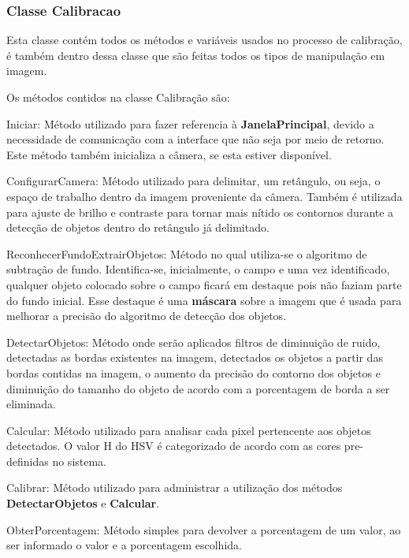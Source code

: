 \subsubsection{Classe Calibracao}
 Esta classe contém todos os métodos e variáveis usados no processo de calibração, é também dentro dessa classe que são feitas todos os tipos de manipulação em imagem.
 
Os métodos contidos na classe Calibração são:
	\begin{description}

\item Iniciar: Método utilizado para fazer referencia à \textbf{JanelaPrincipal}, devido a necessidade de comunicação com a interface que não seja por meio de retorno. Este método também inicializa a câmera, se esta estiver disponível.

\item ConfigurarCamera: Método utilizado para delimitar, um retângulo, ou seja, o espaço de trabalho dentro da imagem proveniente da câmera. Também é utilizada para ajuste de brilho e contraste para tornar mais nítido os contornos durante a detecção de objetos dentro do retângulo já delimitado.	
	
  \item ReconhecerFundoExtrairObjetos: Método no qual utiliza-se o algoritmo de subtração de fundo. Identifica-se, inicialmente, o campo e uma vez identificado, qualquer objeto colocado sobre o campo ficará em destaque pois não faziam parte do fundo inicial. Esse destaque é uma \textbf{máscara} sobre a imagem que é usada para melhorar a precisão do algoritmo de detecção dos objetos.
  
 	\item DetectarObjetos: Método onde serão aplicados filtros de diminuição de ruido, detectadas as bordas existentes na imagem, detectados os objetos a partir das bordas contidas na imagem, o aumento da precisão do contorno dos objetos e diminuição do tamanho do objeto de acordo com a porcentagem de borda a ser eliminada. 

\item Calcular: Método utilizado para analisar cada pixel pertencente aos objetos detectados. O valor H do HSV é categorizado de acordo com as cores pre-definidas no sistema. %

\item Calibrar: Método utilizado para administrar a utilização dos métodos \textbf{DetectarObjetos} e \textbf{Calcular}. %

	\item ObterPorcentagem: Método simples para devolver a porcentagem de um valor, ao ser informado o valor e a porcentagem escolhida.
		
		
	
		\end{description}	

